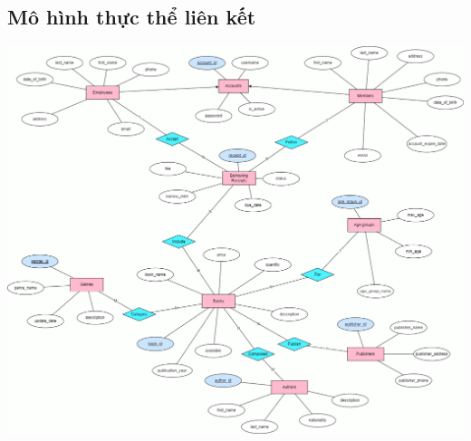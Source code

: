 \documentclass[12pt]{article}
\begin{document}
\subsection{Mô hình thực thể liên kết}
\includegraphics[width=1\textwidth]{SDTTLK.png}
\end{document}

